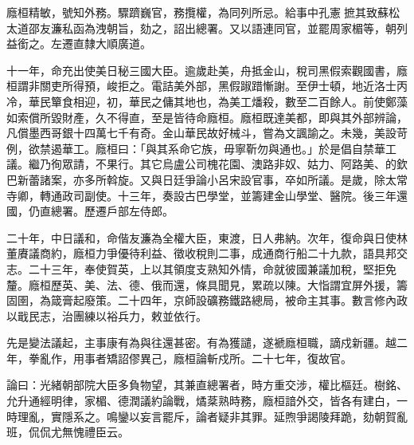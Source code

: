 \begin{pinyinscope}
廕桓精敏，號知外務。驟躋巍官，務攬權，為同列所忌。給事中孔憲摭其致蘇松太道邵友濂私函為洩朝旨，劾之，詔出總署。又以語連同官，並罷周家楣等，朝列益銜之。左遷直隸大順廣道。

十一年，命充出使美日秘三國大臣。逾歲赴美，舟抵金山，稅司黑假索觀國書，廕桓謂非關吏所得預，峻拒之。電詰美外部，黑假踧踖慚謝。至伊士頓，地近洛士丙冷，華民簞食相迎，初，華民之傭其地也，為美工燔殺，數至二百餘人。前使鄭藻如索償所毀財產，久不得直，至是皆待命廕桓。廕桓既達美都，即與其外部辨論，凡償墨西哥銀十四萬七千有奇。金山華民故好械斗，嘗為文諷諭之。未幾，美設苛例，欲禁遏華工。廕桓曰：「與其系命它族，毋寧靳勿與通也。」於是倡自禁華工議。繼乃徇眾請，不果行。其它烏盧公司槐花園、澳路非奴、姑力、阿路美、的欽巴新蕾諸案，亦多所斡旋。又與日廷爭論小呂宋設官事，卒如所議。是歲，除太常寺卿，轉通政司副使。十三年，奏設古巴學堂，並籌建金山學堂、醫院。後三年還國，仍直總署。歷遷戶部左侍郎。

二十年，中日議和，命偕友濂為全權大臣，東渡，日人弗納。次年，復命與日使林董賡議商約，廕桓力爭優待利益、徵收稅則二事，成通商行船二十九款，語具邦交志。二十三年，奉使賀英，上以其領度支熟知外情，命就彼國兼議加稅，堅拒免釐。廕桓歷英、美、法、德、俄而還，條具聞見，累疏以陳。大恉謂宜屏外援，籌固圉，為箴膏起廢策。二十四年，京師設礦務鐵路總局，被命主其事。數言修內政以戢民志，治團練以裕兵力，敕並依行。

先是變法議起，主事康有為與往還甚密。有為獲譴，遂褫廕桓職，謫戍新疆。越二年，拳亂作，用事者矯詔僇異己，廕桓論斬戍所。二十七年，復故官。

論曰：光緒朝部院大臣多負物望，其兼直總署者，時方重交涉，權比樞廷。樹銘、允升通經明律，家楣、德潤議約論戰，燏棻熟時務，廕桓諳外交，皆各有建白，一時理亂，實隱系之。鳴鑾以妄言罷斥，論者疑非其罪。延煦爭謁陵拜跪，劾朝賀亂班，侃侃尤無愧禮臣云。


\end{pinyinscope}